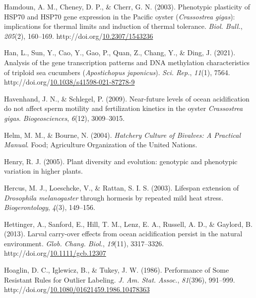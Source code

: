 \documentclass [11pt, proquest] {uwthesis}[2015/03/03]
\newlength{\cslhangindent}
\newenvironment{CSLReferences}%
{\setlength{\parindent}{0pt}%
\everypar{\setlength{\hangindent}{\cslhangindent}}\ignorespaces}%
{\par}
\begin{document}
\begin{CSLReferences}{1}{0}
\leavevmode\hypertarget{ref-Hamdoun2003}{}%
Hamdoun, A. M., Cheney, D. P., \& Cherr, G. N. (2003). {Phenotypic plasticity of HSP70 and HSP70 gene expression in the Pacific oyster (\emph{Crassostrea gigas}): implications for thermal limits and induction of thermal tolerance}. \emph{Biol. Bull.}, \emph{205}(2), 160--169. http://doi.org/\href{https://doi.org/10.2307/1543236}{10.2307/1543236}

\leavevmode\hypertarget{ref-Han2021}{}%
Han, L., Sun, Y., Cao, Y., Gao, P., Quan, Z., Chang, Y., \& Ding, J. (2021). {Analysis of the gene transcription patterns and DNA methylation characteristics of triploid sea cucumbers (\emph{Apostichopus japonicus})}. \emph{Sci. Rep.}, \emph{11}(1), 7564. http://doi.org/\href{https://doi.org/10.1038/s41598-021-87278-9}{10.1038/s41598-021-87278-9}

\leavevmode\hypertarget{ref-Havenhand2009}{}%
Havenhand, J. N., \& Schlegel, P. (2009). {Near-future levels of ocean acidification do not affect sperm motility and fertilization kinetics in the oyster \emph{Crassostrea gigas}}. \emph{Biogeosciences}, \emph{6}(12), 3009--3015.

\leavevmode\hypertarget{ref-Helm2004}{}%
Helm, M. M., \& Bourne, N. (2004). \emph{{Hatchery Culture of Bivalves: A Practical Manual}}. Food; Agriculture Organization of the United Nations.

\leavevmode\hypertarget{ref-Henry2005}{}%
Henry, R. J. (2005). {Plant diversity and evolution: genotypic and phenotypic variation in higher plants}.

\leavevmode\hypertarget{ref-Hercus2003}{}%
Hercus, M. J., Loeschcke, V., \& Rattan, S. I. S. (2003). {Lifespan extension of \emph{Drosophila melanogaster} through hormesis by repeated mild heat stress}. \emph{Biogerontology}, \emph{4}(3), 149--156.

\leavevmode\hypertarget{ref-Hettinger2013}{}%
Hettinger, A., Sanford, E., Hill, T. M., Lenz, E. A., Russell, A. D., \& Gaylord, B. (2013). {Larval carry-over effects from ocean acidification persist in the natural environment}. \emph{Glob. Chang. Biol.}, \emph{19}(11), 3317--3326. http://doi.org/\href{https://doi.org/10.1111/gcb.12307}{10.1111/gcb.12307}

\leavevmode\hypertarget{ref-Hoaglin1986}{}%
Hoaglin, D. C., Iglewicz, B., \& Tukey, J. W. (1986). {Performance of Some Resistant Rules for Outlier Labeling}. \emph{J. Am. Stat. Assoc.}, \emph{81}(396), 991--999. http://doi.org/\href{https://doi.org/10.1080/01621459.1986.10478363}{10.1080/01621459.1986.10478363}


\end{CSLReferences}
\end{document}
